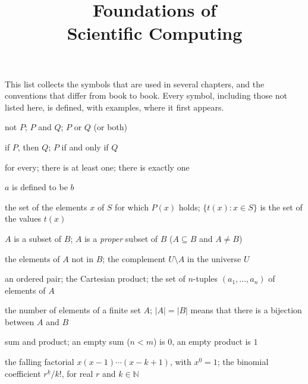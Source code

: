 \documentclass{sdbook-eng}
\title{Foundations of\\Scientific Computing}
\author{}
\date{}
\begin{document}
\frontmatter
\maketitle
\tableofcontents

\notationchapter
This list collects the symbols that are used in several chapters, and the conventions that differ from book to book. Every symbol, including those not listed here, is defined, with examples, where it first appears.

\begin{symbols}
\item[$\neg P$, $P\wedge Q$, $P\vee Q$] not $P$; $P$ and $Q$; $P$ or $Q$ (or both)
\item[$P\Rightarrow Q$, $P\Leftrightarrow Q$] if $P$, then $Q$; $P$ if and only if $Q$
\item[$\forall$, $\exists$, $\exists!$] for every; there is at least one; there is exactly one
\item[$a\coloneqq b$] $a$ is defined to be $b$
\item[$\{x\in S: P(x)\}$] the set of the elements $x$ of $S$ for which $P(x)$ holds; $\{t(x): x\in S\}$ is the set of the values $t(x)$
\item[$A\subseteq B$, $A\subset B$] $A$ is a subset of $B$; $A$ is a \emph{proper} subset of $B$ ($A\subseteq B$ and $A\ne B$)
\item[$A\setminus B$, $A^{\mathrm c}$] the elements of $A$ not in $B$; the complement $U\setminus A$ in the universe $U$
\item[$(a,b)$, $A\times B$, $A^n$] an ordered pair; the Cartesian product; the set of $n$-tuples $(a_1,\ldots,a_n)$ of elements of $A$
\item[$|A|$] the number of elements of a finite set $A$; $|A|=|B|$ means that there is a bijection between $A$ and $B$
\item[$\sum_{k=m}^{n}a_k$, $\prod_{k=m}^{n}a_k$] sum and product; an empty sum ($n<m$) is $0$, an empty product is $1$
\item[$x^{\underline k}$, $\binom rk$] the falling factorial $x(x-1)\cdots(x-k+1)$, with $x^{\underline 0}=1$; the binomial coefficient $r^{\underline k}/k!$, for real $r$ and $k\in\mathbb N$
\end{symbols}
\end{document}

